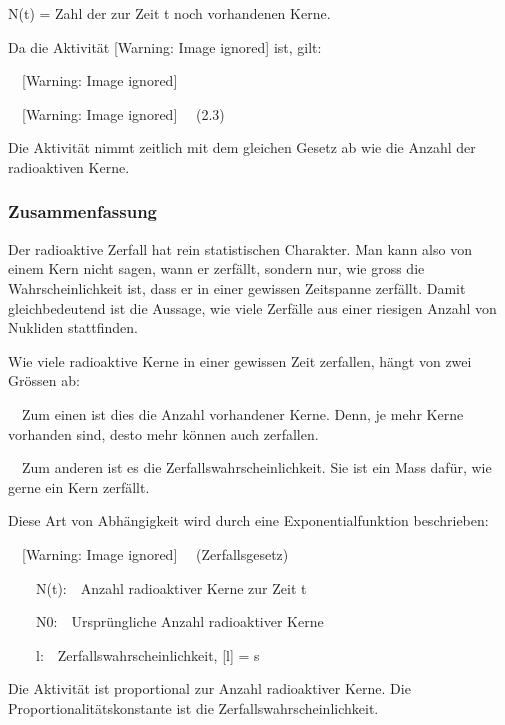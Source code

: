 \documentclass[12pt,a4paper,twoside]{article}
\begin{document}
\bigskip

N(t) = Zahl der zur Zeit t noch vorhandenen Kerne.

Da die Aktivität   [Warning: Image ignored] %
  ist, gilt:

\ \   [Warning: Image ignored] %
 

\ \   [Warning: Image ignored] %
 \ \ (2.3)

Die Aktivität nimmt zeitlich mit dem gleichen Gesetz ab wie die Anzahl der radioaktiven Kerne.

\subsubsection*{Zusammenfassung}
Der radioaktive Zerfall hat rein statistischen Charakter. Man kann also von einem Kern nicht sagen, wann er zerfällt, sondern nur, wie gross die Wahrscheinlichkeit ist, dass er in einer gewissen Zeitspanne zerfällt. Damit gleichbedeutend ist die Aussage, wie viele Zerfälle aus einer riesigen Anzahl von Nukliden stattfinden.

Wie viele radioaktive Kerne in einer gewissen Zeit zerfallen, hängt von zwei Grössen ab:

{\textbullet}\ \ Zum einen ist dies die Anzahl vorhandener Kerne. Denn, je mehr Kerne vorhanden sind, desto mehr können auch zerfallen.

{\textbullet}\ \ Zum anderen ist es die Zerfallswahrscheinlichkeit. Sie ist ein Mass dafür, wie {\quotedblbase}gerne{\quotedblbase} ein Kern zerfällt.

Diese Art von Abhängigkeit wird durch eine Exponentialfunktion beschrieben:

\ \   [Warning: Image ignored] %
 \ \ (Zerfallsgesetz)

\ \ \ \ N(t):\ \ Anzahl radioaktiver Kerne zur Zeit t

\ \ \ \ N0:\ \ Ursprüngliche Anzahl radioaktiver Kerne

\ \ \ \ l:\ \ Zerfallswahrscheinlichkeit, [l] = s

Die Aktivität ist proportional zur Anzahl radioaktiver Kerne. Die Proportionalitätskonstante ist die Zerfallswahrscheinlichkeit.
\end{document}
